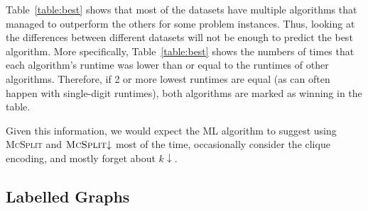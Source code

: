 \documentclass{l4proj}
\theoremstyle{definition}
\theoremstyle{remark}
\begin{document}
Table~\ref{table:best} shows that most of the datasets have multiple algorithms
that managed to outperform the others for some problem instances. Thus, looking
at the differences between different datasets will not be enough to predict the
best algorithm. More specifically, Table~\ref{table:best} shows the numbers of
times that each algorithm's runtime was lower than or equal to the runtimes of
other algorithms. Therefore, if 2 or more lowest runtimes are equal (as can
often happen with single-digit runtimes), both algorithms are marked as winning
in the table.

Given this information, we would expect the ML algorithm to suggest using
\textsc{McSplit} and $\textsc{McSplit}{\downarrow}$ most of the time, occasionally
consider the clique encoding, and mostly forget about $k{\downarrow}$.

\subsection{Labelled Graphs} \label{sec:labelled_runtimes}
\end{document}
